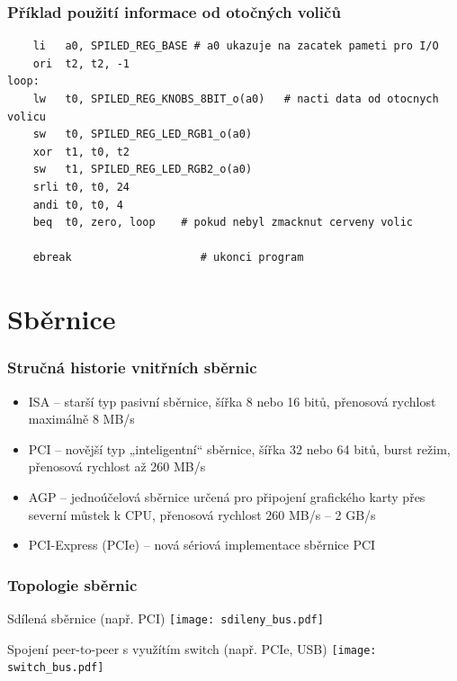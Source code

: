 \documentclass{beamer}
\begin{document}
\begin{frame}[fragile]
\frametitle{Příklad použití informace od otočných voličů}

\begin{verbatim}
    li   a0, SPILED_REG_BASE # a0 ukazuje na zacatek pameti pro I/O
    ori  t2, t2, -1
loop:
    lw   t0, SPILED_REG_KNOBS_8BIT_o(a0)   # nacti data od otocnych volicu
    sw   t0, SPILED_REG_LED_RGB1_o(a0)
    xor  t1, t0, t2
    sw   t1, SPILED_REG_LED_RGB2_o(a0)
    srli t0, t0, 24
    andi t0, t0, 4
    beq  t0, zero, loop    # pokud nebyl zmacknut cerveny volic

    ebreak                    # ukonci program
\end{verbatim}
\end{frame}

\section{Sběrnice}

\begin{frame}
\frametitle{Stručná historie vnitřních sběrnic}

\begin{itemize}
\item ISA – starší typ pasivní sběrnice, šířka 8 nebo 16 bitů, přenosová rychlost maximálně 8 MB/s
\item PCI – novější typ „inteligentní“ sběrnice, šířka 32 nebo 64 bitů, burst režim, přenosová rychlost až 260 MB/s
\item AGP – jednoúčelová sběrnice určená pro připojení grafického karty přes severní můstek k CPU, přenosová rychlost 260 MB/s – 2 GB/s
\item PCI-Express (PCIe) – nová sériová implementace sběrnice PCI
\end{itemize}
\end{frame}


\begin{frame}
\frametitle{Topologie sběrnic}
\begin{center}
Sdílená sběrnice (např. PCI)
\texttt{[image: sdileny\_bus.pdf]}
\end{center}

\begin{center}
Spojení peer-to-peer s využítím switch (např. PCIe, USB)
\texttt{[image: switch\_bus.pdf]}
\end{center}
\end{frame}
\end{document}
